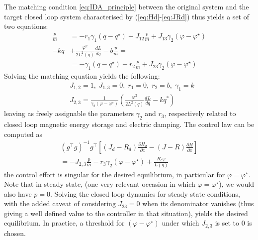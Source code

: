 \documentclass[letterpaper, 10pt, conference]{ieeeconf}
\begin{document}
The matching condition \eqref{eq:IDA_principle} between the original system and the target closed loop system characterised by (\ref{eq:Hd}-\ref{eq:JRd}) thus yields a set of two equations:
\begin{equation}
    \begin{aligned}
        \frac{p}{m} &= -r_{1} \gamma_{1}(q-q^\star) + J_{12} \frac{p}{m} + J_{13}\gamma_{2}(\varphi - \varphi^\star)     \\ 
        -kq  &+ \frac{\varphi^2}{2L^2(q)} \frac{dL}{dq} - b\frac{p}{m} = \\ &=-\gamma_{1}(q-q^\star) - r_{2} \frac{p}{m} + J_{23}\gamma_{2} (\varphi-\varphi^\star)
    \end{aligned}
\end{equation}
Solving the matching equation yields the following:
\begin{equation}
    \begin{aligned}
    &J_{1,2}=1, \; J_{1,3}=0, \; r_1=0, \; r_2=b, \; \gamma_1=k\\
    &J_{2,3}=\frac{1}{\gamma_{2}(\varphi-\varphi^\star)} \left(\frac{\varphi^2}{2L^2(q)} \frac{dL}{dq}-kq^*\right)
    \end{aligned}
\end{equation}
leaving as freely assignable the parameters $\gamma_2$ and $r_3$, respectively related to closed loop magnetic energy storage and electric damping. The control law can be computed as 
\begin{equation}
    \begin{multlined}
        (g^\top g)^{-1}g^\top \left[ (J_{d}-R_{d}) \frac{\partial H_{d}}{\partial x} - (J-R) \frac{\partial H}{\partial x} \right] \\
        = -J_{2,3} \frac{p}{m} -r_{3}\gamma_{2}(\varphi -\varphi^\star) + \frac{R_{c}\varphi}{L(q)}
    \end{multlined}
\end{equation}
the control effort is singular for the desired equilibrium, in particular for $\varphi = \varphi^\star$. Note that in steady state, (one very relevant occasion in which $\varphi=\varphi^\star$), we would also have $p=0$. Solving the closed loop dynamics for steady state conditions, with the added caveat of considering $J_{23}=0$ when its denominator vanishes (thus giving a well defined value to the controller in that situation), yields the desired equilibrium. In practice, a threshold for $(\varphi-\varphi^\star)$ under which $J_{2,3}$ is set to 0 is chosen.
\end{document}
